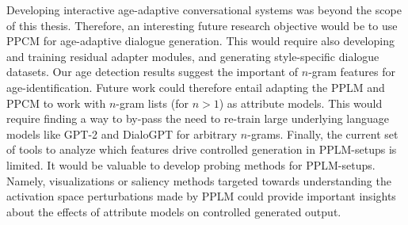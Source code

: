 Developing interactive age-adaptive conversational systems was beyond the scope of this thesis. Therefore, an interesting future research objective would be to use PPCM for age-adaptive dialogue generation. This would require also developing and training residual adapter modules, and generating style-specific dialogue datasets. Our age detection results suggest the important of $n$-gram features for age-identification. Future work could therefore entail adapting the PPLM and PPCM to work with $n$-gram lists (for $n>1$) as attribute models. This would require finding a way to by-pass the need to re-train large underlying language models like GPT-2 and DialoGPT for arbitrary $n$-grams. Finally, the current set of tools to analyze which features drive controlled generation in PPLM-setups is limited. It would be valuable to develop probing methods for PPLM-setups. Namely, visualizations or saliency methods targeted towards understanding the activation space perturbations made by PPLM could provide important insights about the effects of attribute models on controlled generated output.


